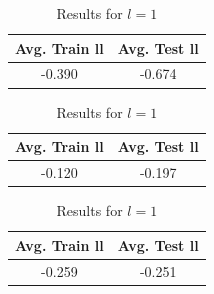 \documentclass[english]{article}
\providecommand{\tabularnewline}{\\}
\begin{document}
\begin{table}
\centering{}%
\begin{minipage}[t]{0.3\textwidth}%
\begin{center}
\begin{tabular}{c|c}
\textbf{Avg. Train ll} & \textbf{Avg. Test ll}\tabularnewline
\hline 
-0.390 & -0.674\tabularnewline
\hline 
\end{tabular}\caption{Results for $l=0.01$\label{tab:avg_ll_l_001}}
\par\end{center}%
\end{minipage}\hspace{0.5cm}%
\begin{minipage}[t]{0.3\textwidth}%
\begin{center}
\begin{tabular}{c|c}
\textbf{Avg. Train ll} & \textbf{Avg. Test ll}\tabularnewline
\hline 
-0.120 & -0.197\tabularnewline
\hline 
\end{tabular}\caption{Results for $l=0.1$\label{tab:avg_ll_l_01}}
\par\end{center}%
\end{minipage}\hspace{0.5cm}%
\begin{minipage}[t]{0.3\textwidth}%
\begin{center}
\begin{tabular}{c|c}
\textbf{Avg. Train ll} & \textbf{Avg. Test ll}\tabularnewline
\hline 
-0.259 & -0.251\tabularnewline
\hline 
\end{tabular}\caption{Results for $l=1$\label{tab:avg_ll_l_1}}
\par\end{center}%
\end{minipage}
\end{table}
\end{document}
